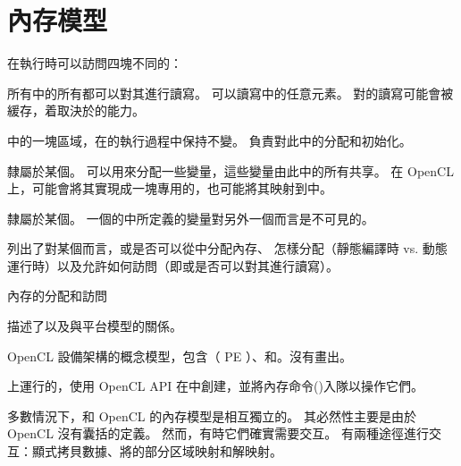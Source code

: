 
\section{內存模型}
在執行時可以訪問四塊不同的：

\startigBase
\item {}所有中的所有都可以對其進行讀寫。
可以讀寫中的任意元素。
對的讀寫可能會被緩存，着取決於的能力。

\item {}中的一塊區域，在的執行過程中保持不變。
負責對此中的分配和初始化。

\item {}隸屬於某個。
可以用來分配一些變量，這些變量由此中的所有共享。
在 OpenCL 上，可能會將其實現成一塊專用的，也可能將其映射到中。

\item {}隸屬於某個。
一個的中所定義的變量對另外一個而言是不可見的。
\stopigBase

列出了對某個而言，或是否可以從中分配內存、
怎樣分配（靜態編譯時 vs. 動態運行時）以及允許如何訪問（即或是否可以對其進行讀寫）。

\startbuffer[buftblcapmemregion]
內存的分配和訪問
\stopbuffer
{}

描述了以及與平台模型的關係。

\startbuffer[buffigcapopenclarch]
OpenCL 設備架構的概念模型，包含（ PE ）、和。沒有畫出。
\stopbuffer

{}

上運行的，使用 OpenCL API 在中創建，並將內存命令()入隊以操作它們。

多數情況下，和 OpenCL 的內存模型是相互獨立的。
其必然性主要是由於 OpenCL 沒有囊括的定義。
然而，有時它們確實需要交互。
有兩種途徑進行交互：顯式拷貝數據、將的部分区域映射和解映射。

